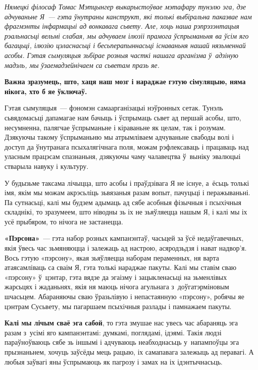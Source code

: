 \emph{Нямецкі філосаф Томас Мэтцынгер выкарыстоўвае мэтафару тунэлю эга, дзе адчуваньне Я~--- гэта ўнутраны канструкт, які толькі выбіральна паказвае нам фрагмэнты інфармацыі ад вонкавага сьвету. Але, хоць наша рэпрэзэнтацыя рэальнасьці вельмі слабая, мы адчуваем ілюзіі прамога ўспрыманьня ва ўсім яго багацьці, ілюзію цэласнасьці і бесьперапыннасьці існаваньня нашай нязьменнай асобы. Гэтая сымуляцыя зьбірае розныя часткі нашага арганізма ў~адзіную мадэль, мы ўзаемадзейнічаем са сьветам празь яе.}

\textbf{Важна зразумець, што, хаця наш мозг і нараджае гэтую сімуляцыю, няма нікога, хто б яе ўключаў.}

Гэтая сымуляцыя~--- фэномэн самаарганізацыі нэўронных сетак. Тунэль сьвядомасьці дапамагае нам бачыць і ўспрымаць сьвет ад першай асобы, што, несумненна, палягчае ўспрыманьне і кіраваньне як целам, так і розумам. Дзякуючы такому ўспрыманьню мы атрымліваем адчуваньне свабоды волі і доступ да ўнутранага псыхалягічнага поля, можам рэфлексаваць і працаваць над уласным працэсам спазнаньня, дзякуючы чаму чалавецтва ў~выніку эвалюцыі стварыла навуку і культуру.

У будызьме таксама лічыцца, што асобы і праўдзівага Я не існуе, а~ёсьць толькі імя, якім мы можам акрэсьліць зьвязаныя разам вопыт, пачуцьці і перажываньні. Па сутнасьці, калі мы будзем адымаць ад сябе асобныя фізычныя і псыхічныя складнікі, то зразумеем, што ніводны зь іх не зьяўляецца нашым Я, і калі мы іх усё прыбяром, то нічога не застанецца.


\textbf{«Пэрсона»}~--- гэта набор розных кампанэнтаў, часьцей за ўсё недаўгавечных, якія ўвесь час зьмяняюцца і залежаць ад настрою, асяродзьдзя і нават надвор'я. Вось гэтую «пэрсону», якая зьяўляецца наборам пераменных, ня варта атаясамліваць са сваім Я, гэта толькі нараджае пакуты. Калі мы ставім сваю «пэрсону» ў~цэнтар, гэта вядзе да эгаізму і зацыкленасьці на зьменлівых жарсьцях і жаданьнях, якія ня маюць нічога агульнага з~доўгатэрміновым шчасьцем. Абараняючы сваю ўразьлівую і непастаянную «пэрсону», робячы яе цэнтрам Сусьвету, мы пагаршаем псыхічныя разлады і памнажаем пакуты.

\textbf{Калі мы лічым сваё эга сабой}, то гэта змушае нас увесь час абараняць эга разам з~усімі яго кампанэнтамі: думкамі, поглядамі, ідэямі. Такія людзі параўноўваюць сябе зь іншымі і адчуваюць неабходнасьць у~напампоўцы эга прызнаньнем, хочуць заўсёды мець рацыю, іх самапавага залежыць ад перавагі. А любыя заўвагі яны ўспрымаюць як пагрозу і замах на іх ідэнтычнасьць.

